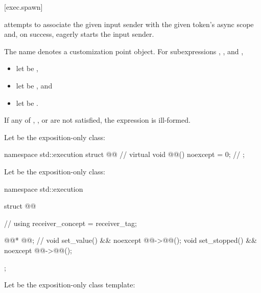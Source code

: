[exec.spawn]{}

\pnum
{} attempts to associate the given input sender with
the given token's async scope and, on success,
eagerly starts the input sender.

\pnum
The name  denotes a customization point object.
For subexpressions , , and ,
\begin{itemize}
\item let  be ,
\item let  be , and
\item let  be .
\end{itemize}
If any of
,
, or
are not satisfied,
the expression  is ill-formed.

\pnum
Let  be the exposition-only class:

%
\begin{codeblock}
namespace std::execution {
  struct @@ {                                 // \expos
    virtual void @@() noexcept = 0;                   // \expos
  };
}
\end{codeblock}

\pnum
Let  be the exposition-only class:

%
\begin{codeblock}
namespace std::execution {
  struct @@ {                                   // \expos
    using receiver_concept = receiver_tag;

    @@* @@;                                // \expos
    void set_value() && noexcept { @@->@@(); }
    void set_stopped() && noexcept { @@->@@(); }
  };
}
\end{codeblock}

\pnum
Let  be the exposition-only class template:

